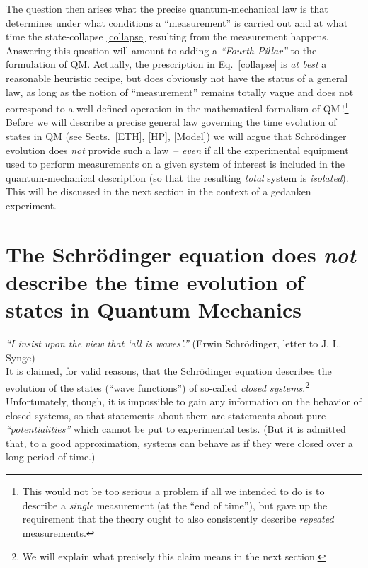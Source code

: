 \documentclass[a4paper,11pt]{article}
\begin{document}
The question then arises what the precise quantum-mechanical law is that determines under what conditions a ``measurement'' is carried out and at what time the state-collapse \eqref{collapse} resulting from the measurement happens. 
Answering this question will amount to adding a \textit{``Fourth Pillar''} to the formulation of QM. Actually, the prescription 
in Eq.~\eqref{collapse} is \textit{at best} a reasonable heuristic recipe, but does obviously not have the status of a general law, 
as long as the notion of ``measurement'' remains totally vague and does not correspond to a well-defined operation in 
the mathematical formalism of QM\,!\footnote{This would not be too serious a problem if all we intended to do is to describe 
a \textit{single} measurement (at the ``end of time''), but gave up the requirement that the theory ought to also consistently 
describe \textit{repeated} measurements.} Before we will describe a precise general law governing the time evolution 
of states in QM (see Sects.~\ref{ETH}, \ref{HP}, \ref{Model}) we will argue that Schr\"odinger evolution does \textit{not} 
provide such a \mbox{law --} \textit{even} if all the experimental equipment used to perform measurements on a given 
system of interest is included in the quantum-mechanical description (so that the resulting \textit{total} system is \textit{isolated}). This will be discussed in the next section in the context of a gedanken experiment.
\newpage

\section{The Schr\"odinger equation does \textit{not} describe the time evolution of states in Quantum Mechanics}\label{Schroedinger evol}
\hspace{0.5cm}\textit{``I insist upon the view that `all is waves'.''} (Erwin Schr\"odinger, letter to J. L. Synge)\\

It is claimed, for valid reasons, that the Schr\"odinger equation describes the evolution of the states 
(``wave functions'') of so-called \textit{closed systems}.\footnote{We will explain what precisely this claim means in the next section.} 
 Unfortunately, though, it is impossible to gain any information on the behavior of closed systems, so that 
statements about them are statements about pure \textit{``potentialities''} which cannot be put to experimental tests. 
(But it is admitted that, to a good approximation, systems can behave as if they were closed over a long period of time.)
\end{document}
